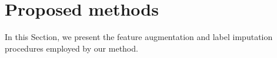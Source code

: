 \documentclass[conference,compsoc]{IEEEtran}
\begin{document}




 

\section{Proposed methods}
In this Section, we present the feature augmentation and label imputation procedures employed by our method. 
\label{sec:methods}
\end{document}
